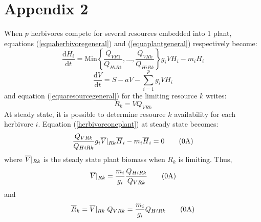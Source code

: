\documentclass[12pt]{article}
\newcommand\equa[1]{\frac{\mathrm{d}#1}{\mathrm{d}t}}
\newcommand\barre[1]{\overline{\rule{0pt}{1.5ex}#1}}
\begin{document}
\section*{Appendix 2}
When $p$ herbivores compete for several resources embedded into 1 plant, equations (\ref{equaherbivoregeneral}) and (\ref{equaplantgeneral}) respectively become:
\begin{equation}\label{herbivoreoneplant}
\equa{H_i}= \text{Min} \left \lbrace \frac{Q_{VR1}}{Q_{HiR1}}, \ldots, \frac{Q_{VRk}}{Q_{HiRk}}  \right \rbrace g_iV H_i -m_i H_i \tag{\theequation A}
\end{equation}
\begin{equation}
\equa{V}=S-aV-\sum ^p _{i=1} g_iVH_i \tag{\theequation A}
\end{equation}
and equation (\ref{equaresourcegeneral}) for the limiting resource $k$ writes:
\begin{equation}
R_k=VQ_{VRk} \tag{\theequation A}
\end{equation}
At steady state, it is possible to determine resource $k$ availability for each herbivore $i$. %
Equation (\ref{herbivoreoneplant}) at steady state becomes:
\begin{equation}
\frac{Q_{VRk}}{Q_{HiRk}} g_i \barre{V}|_{Rk} \barre{H}_i -m_i \barre{H}_i = 0 \tag{\theequation A}
\end{equation}
where $\barre{V}|_{Rk}$ is the steady state plant biomass when $R_k$ is limiting. Thus,
\begin{equation}
\barre{V}|_{Rk}=\frac{m_i}{g_i}\frac{Q_{HiRk}}{Q_{VRk}} \tag{\theequation A}
\end{equation}
and 
\begin{equation}
\barre{R}_k=\barre{V}|_{Rk}\; Q_{VRk} =\frac{m_i}{g_i}Q_{HiRk} \tag{\theequation A}
\end{equation}
\end{document}
